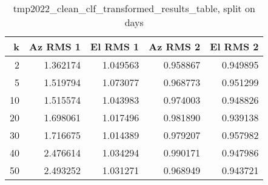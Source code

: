 \begin{table}[h]
    \centering
    \caption{tmp2022_clean_clf_transformed_results_table, split on days}
    \begin{tabular}{rrrrr}
        \toprule
         k & Az RMS 1 & El RMS 1 & Az RMS 2 & El RMS 2 \\
        \midrule
         2 &  1.362174 & 1.049563 &  0.958867 &  0.949895 \\
         5 &  1.519794 & 1.073077 &  0.968773 &  0.951299 \\
        10 &  1.515574 & 1.043983 &  0.974003 &  0.948826 \\
        20 &  1.698061 & 1.017496 &  0.981890 &  0.939138 \\
        30 &  1.716675 & 1.014389 &  0.979207 &  0.957982 \\
        40 &  2.476614 & 1.034294 &  0.990171 &  0.947986 \\
        50 &  2.493252 & 1.031271 &  0.968949 &  0.943721 \\
        \bottomrule
    \end{tabular}        
\end{table}